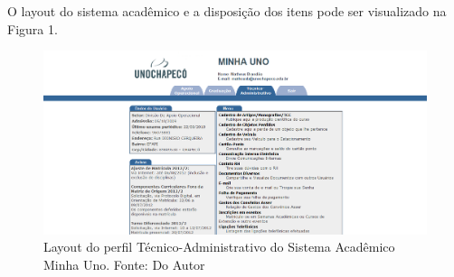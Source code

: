 O layout do sistema acadêmico e a disposição dos itens pode ser visualizado na Figura 1.


\begin{figure}[!htb]
     \centering
     \includegraphics[scale=0.4]{imagens/tecnico.png}
     \caption[Layout do Sistema - Perfil Técnico-Administrativo]{Layout do perfil Técnico-Administrativo do Sistema Acadêmico Minha Uno. Fonte: Do Autor}
\end{figure}